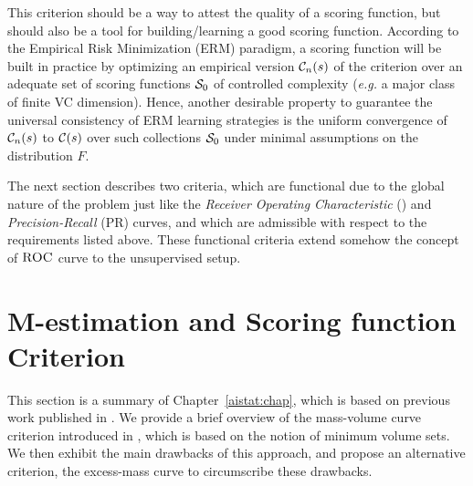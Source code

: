 This criterion should be a way to attest the quality of a scoring function, but should also be a tool for building/learning a good scoring function.
According to the Empirical Risk Minimization (ERM) paradigm, a scoring function will be built in practice by optimizing  an empirical version $\crit_n(s)$ of the criterion over an adequate set of scoring functions $\S_0$ of controlled complexity (\textit{e.g.} a major class of finite {\sc VC} dimension). Hence, another desirable property to guarantee the universal consistency of ERM learning strategies is the uniform convergence of $\crit_n(s)$ to $\crit(s)$ over such collections $\S_0$ under minimal assumptions on the distribution $F$.

The next section describes two criteria, which are functional due to the global nature of the problem just like the \emph{Receiver Operating Characteristic} (\roc) and \emph{Precision-Recall} (PR) curves, and which are admissible with respect to the requirements listed above. These functional criteria extend somehow the concept of $\roc$ curve to the unsupervised setup.

\section{M-estimation and Scoring function Criterion}
\label{resume:scoring}

This section is a summary of Chapter~\ref{aistat:chap}, which is based on previous work published in \cite{AISTAT15}. We provide a brief overview of the mass-volume curve criterion introduced in \cite{CLEM13}, which is based on the notion of minimum volume sets. We then exhibit the main drawbacks of this approach, and propose an alternative criterion, the excess-mass curve to circumscribe these drawbacks. 

